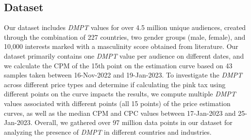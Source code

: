 \documentclass[twocolumn]{bmcart}\usepackage{lineno}
\begin{document}
\subsection{Dataset}
Our dataset includes \emph{DMPT} values for over 4.5 million unique audiences, created through the combination of 227 countries, two gender groups (male, female), and 10,000 interests marked with a masculinity score obtained from literature\cite{cuevas2021gender}. Our dataset primarily contains one \emph{DMPT} value per audience on different dates, and we calculate the CPM of the 15th point on the estimation curve based on 43 samples taken between 16-Nov-2022 and 19-Jan-2023. To investigate the \emph{DMPT} across different price types and determine if calculating the pink tax using different points on the curve impacts the results, we compute multiple \emph{DMPT} values associated with different points (all 15 points) of the price estimation curves, as well as the median CPM and CPC values between 17-Jan-2023 and 25-Jan-2023. Overall, we gathered over 97 million data points in our dataset for analyzing the presence of \emph{DMPT} in different countries and industries. 
\end{document}
